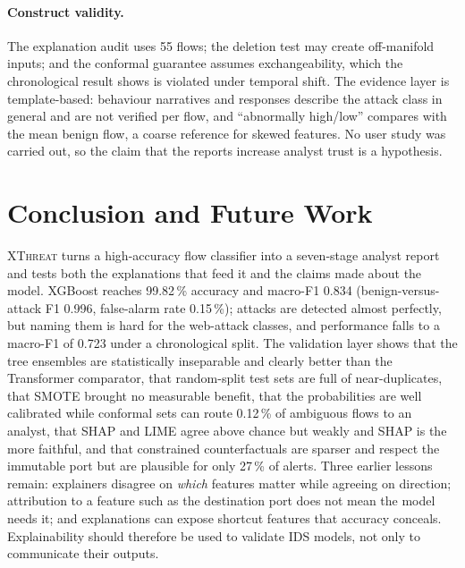 \documentclass[11pt,a4paper]{article}
\newcommand{\XT}{\textsc{XThreat}}
\begin{document}
\paragraph{Construct validity.} The explanation audit uses 55 flows; the deletion test may create off-manifold inputs; and the conformal guarantee assumes exchangeability, which the chronological result shows is violated under temporal shift. The evidence layer is template-based: behaviour narratives and responses describe the attack class in general and are not verified per flow, and ``abnormally high/low'' compares with the mean benign flow, a coarse reference for skewed features. No user study was carried out, so the claim that the reports increase analyst trust is a hypothesis.

\section{Conclusion and Future Work}
\label{sec:conclusion}

\XT{} turns a high-accuracy flow classifier into a seven-stage analyst report and tests both the explanations that feed it and the claims made about the model. XGBoost reaches 99.82\,\% accuracy and macro-F1 0.834 (benign-versus-attack F1 0.996, false-alarm rate 0.15\,\%); attacks are detected almost perfectly, but naming them is hard for the web-attack classes, and performance falls to a macro-F1 of 0.723 under a chronological split. The validation layer shows that the tree ensembles are statistically inseparable and clearly better than the Transformer comparator, that random-split test sets are full of near-duplicates, that SMOTE brought no measurable benefit, that the probabilities are well calibrated while conformal sets can route 0.12\,\% of ambiguous flows to an analyst, that SHAP and LIME agree above chance but weakly and SHAP is the more faithful, and that constrained counterfactuals are sparser and respect the immutable port but are plausible for only 27\,\% of alerts. Three earlier lessons remain: explainers disagree on \emph{which} features matter while agreeing on direction; attribution to a feature such as the destination port does not mean the model needs it; and explanations can expose shortcut features that accuracy conceals. Explainability should therefore be used to validate IDS models, not only to communicate their outputs.
\end{document}

